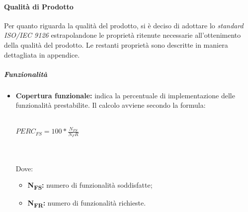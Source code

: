 \paragraph{Qualità di Prodotto}
Per quanto riguarda la qualità del prodotto, si è deciso di adottare lo
\textit{standard ISO/IEC 9126\glos} estrapolandone le proprietà ritenute necessarie
all'ottenimento della qualità del prodotto. Le restanti proprietà sono descritte in maniera dettagliata in appendice.
\subparagraph*{Funzionalità}
\begin{itemize}
	\item \textbf{Copertura funzionale:} indica la percentuale di implementazione delle funzionalità prestabilite. Il calcolo avviene secondo la formula:\\\\
	\centerline{
		\begin{math}
		PERC_{FS}=100*\frac{N_{FS}}{N_FR}
		\end{math}
	}
	\\\\
	Dove:
	\begin{itemize}
		\item \textbf{N\textsubscript{FS}:} numero di funzionalità soddisfatte;
		\item \textbf{N\textsubscript{FR}:} numero di funzionalità richieste.
	\end{itemize}
\end{itemize}


